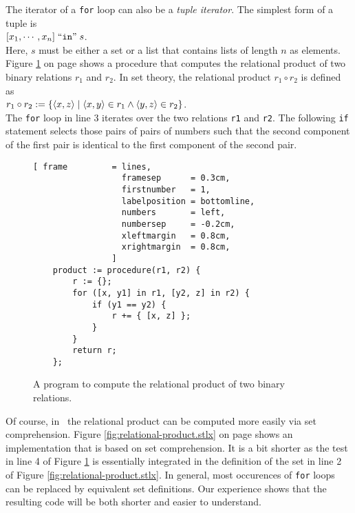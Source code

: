 The iterator of a \texttt{for} loop can also be a \emph{tuple iterator}.  The simplest form of
a tuple is
\\[0.2cm]
\hspace*{1.3cm}
 $[x_1, \cdots, x_n] \;\mbox{``\texttt{in}''}\; s$.
\\[0.2cm]
Here, $s$ must be either a set or a list that contains lists of length $n$ as elements. 
Figure \ref{fig:relational-product-for.stlx} on page \pageref{fig:relational-product-for.stlx}
shows a procedure that computes the relational product 
of two binary relations $r_1$ and $r_2$.  In set theory, the relational product $r_1 \circ r_2$
is defined as
\\[0.2cm]
\hspace*{1.3cm}
$r_1 \circ r_2 := \{ \pair(x,z) \mid \pair(x,y) \in r_1 \wedge \pair(y,z) \in r_2 \}$.
\\[0.2cm]
The \texttt{for} loop in line 3 iterates over the two relations \texttt{r1} and \texttt{r2}.
The following \texttt{if} statement selects those pairs of pairs of numbers such that the second
component of the first pair is identical to the first component of the second pair.

\begin{figure}[!ht]
\centering
\begin{Verbatim}[ frame         = lines, 
                  framesep      = 0.3cm, 
                  firstnumber   = 1,
                  labelposition = bottomline,
                  numbers       = left,
                  numbersep     = -0.2cm,
                  xleftmargin   = 0.8cm,
                  xrightmargin  = 0.8cm,
                ]
    product := procedure(r1, r2) {
        r := {};
        for ([x, y1] in r1, [y2, z] in r2) {
            if (y1 == y2) {
                r += { [x, z] };
            }
        }
        return r;
    };
\end{Verbatim}
\vspace*{-0.3cm}
\caption{A program to compute the relational product of two binary relations.}
\label{fig:relational-product-for.stlx}
\end{figure}

Of course, in \setlx\ the relational product can be computed more easily via set comprehension.
Figure \ref{fig:relational-product.stlx} on page \pageref{fig:relational-product.stlx} shows
an implementation that is based on set comprehension.  It is a bit shorter as the test in
line 4 of Figure \ref{fig:relational-product-for.stlx} is essentially integrated in the
definition of the set in line 2 of Figure \ref{fig:relational-product.stlx}.
In general, most occurences of \texttt{for} loops can be replaced by equivalent set
definitions. Our experience shows that the resulting code will be both shorter and easier to understand.


